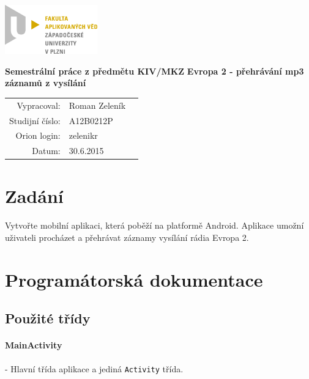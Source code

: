 \documentclass[12pt,a4paper,titlepage]{article}
\begin{document}
\includegraphics[width = 4cm]{LOGO.png} 
\\[8\baselineskip]
\begin{center}

\LARGE\textbf{Semestrální práce z předmětu KIV/MKZ}\linebreak\linebreak
\Large\textbf{Evropa 2 - přehrávání mp3 záznamů z vysílání}\\[11\baselineskip]
\end{center}

\begin{center}
\begin{tabular}{rll}
Vypracoval: & Roman Zeleník \\ 
Studijní číslo: & A12B0212P \\ 
Orion login: & zelenikr \\ 
Datum: & \multicolumn{2}{l}{30.6.2015} \\ 
\end{tabular} 
\end{center}
\thispagestyle{empty}
\pagebreak 

\renewcommand{\cftsecleader}{\cftdotfill{\cftdotsep}}
\tableofcontents
\thispagestyle{empty}
\pagebreak
\setcounter{page}{1}
\section{Zadání}
	\paragraph{}
	Vytvořte mobilní aplikaci, která poběží na platformě Android. Aplikace umožní uživateli procházet a přehrávat záznamy vysílání rádia Evropa 2.

\section{Programátorská dokumentace}
	\subsection{Použité třídy}
	\paragraph{MainActivity}
	- Hlavní třída aplikace a jediná \texttt{Activity} třída. 
	
\end{document}
